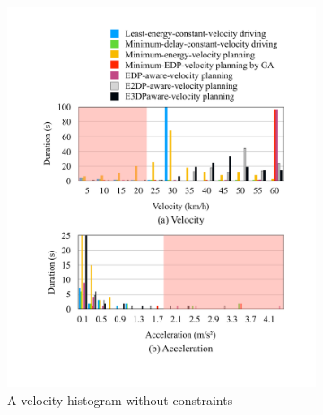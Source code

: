 \documentclass{IEEEtran}
\begin{document}
\begin{figure}
\begin{subfigure}{0.5\textwidth}
	\includegraphics[width=\hsize]{Figures/Histogram_noconst_vel.pdf}
	\caption{A velocity histogram without constraints}
	\label{fig:histogram_noconst_vel}
	\end{subfigure}
	\begin{subfigure}{0.5\textwidth}

\end{subfigure}
\end{figure}
\end{document}
